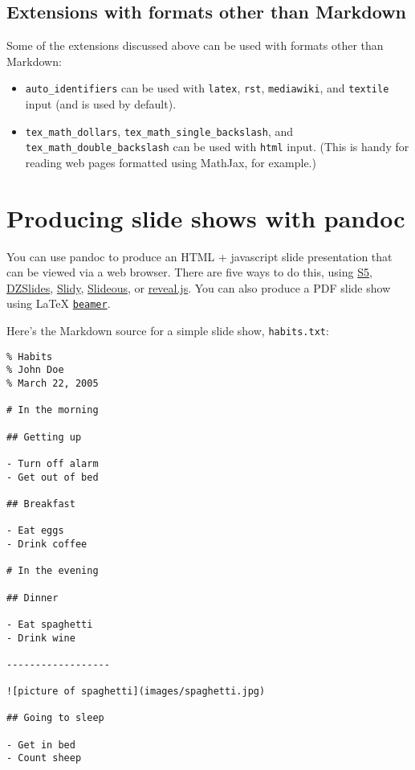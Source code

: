 \documentclass[]{article}
\begin{document}
\subsection{Extensions with formats other than
Markdown}\label{extensions-with-formats-other-than-markdown}

Some of the extensions discussed above can be used with formats other
than Markdown:

\begin{itemize}
\item
  \texttt{auto\_identifiers} can be used with \texttt{latex},
  \texttt{rst}, \texttt{mediawiki}, and \texttt{textile} input (and is
  used by default).
\item
  \texttt{tex\_math\_dollars}, \texttt{tex\_math\_single\_backslash},
  and \texttt{tex\_math\_double\_backslash} can be used with
  \texttt{html} input. (This is handy for reading web pages formatted
  using MathJax, for example.)
\end{itemize}

\hypertarget{producing-slide-shows-with-pandoc}{\section{Producing slide
shows with pandoc}\label{producing-slide-shows-with-pandoc}}

You can use pandoc to produce an HTML + javascript slide presentation
that can be viewed via a web browser. There are five ways to do this,
using \href{http://meyerweb.com/eric/tools/s5/}{S5},
\href{http://paulrouget.com/dzslides/}{DZSlides},
\href{http://www.w3.org/Talks/Tools/Slidy/}{Slidy},
\href{http://goessner.net/articles/slideous/}{Slideous}, or
\href{http://lab.hakim.se/reveal-js/}{reveal.js}. You can also produce a
PDF slide show using LaTeX
\href{https://ctan.org/pkg/beamer}{\texttt{beamer}}.

Here's the Markdown source for a simple slide show, \texttt{habits.txt}:

\begin{verbatim}
% Habits
% John Doe
% March 22, 2005

# In the morning

## Getting up

- Turn off alarm
- Get out of bed

## Breakfast

- Eat eggs
- Drink coffee

# In the evening

## Dinner

- Eat spaghetti
- Drink wine

------------------

![picture of spaghetti](images/spaghetti.jpg)

## Going to sleep

- Get in bed
- Count sheep
\end{verbatim}
\end{document}
